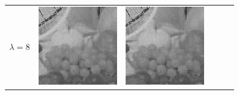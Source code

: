 \documentclass[11pt,a4paper,openright,oneside]{book}
\numberwithin{equation}{section}
\begin{document}
{\begin{figure}[h]
\begin{adjustwidth}{-3cm}{-3cm}
\begin{tabular}{>{\centering\arraybackslash}m{1.5cm} m{2.5cm} m{2.5cm} m{2.5cm} m{2.5cm} m{2.5cm}}
        $\lambda = 8$ &
        \includegraphics[width=\linewidth]{media/tnale/AAAfruits-comp1-ale-8.png} &
        \includegraphics[width=\linewidth]{media/tnale/AAAfruits-comp2-ale-8.png} &

\end{tabular}
\end{adjustwidth}
\end{figure}}
\end{document}
